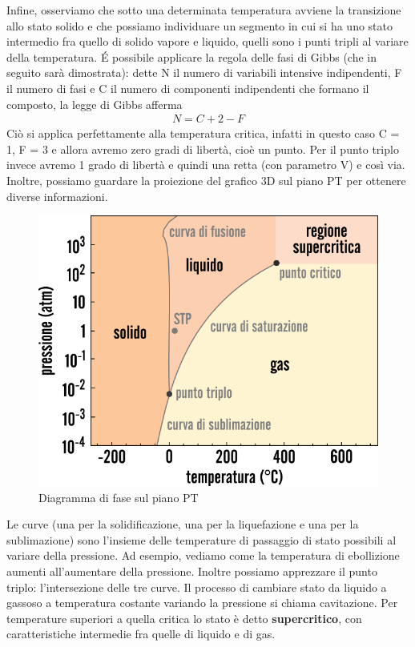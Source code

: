 \documentclass[
10pt, %
a4paper, %
oneside, %
headinclude,footinclude, %
BCOR5mm, %
]{scrartcl}
\begin{document}
Infine, osserviamo che sotto una determinata temperatura avviene la transizione allo stato solido e che possiamo individuare un segmento in cui si ha uno stato intermedio fra quello di solido vapore e liquido, quelli sono i punti tripli al variare della temperatura. \'{E} possibile applicare la regola delle fasi di Gibbs (che in seguito sarà dimostrata): dette N il numero di variabili intensive indipendenti, F il numero di fasi e C il numero di componenti indipendenti che formano il composto, la legge di Gibbs afferma
\begin{align*} 
	N = C + 2 - F
\end{align*}  
Ciò si applica perfettamente alla temperatura critica, infatti in questo caso C = 1, F = 3 e allora avremo zero gradi di libertà, cioè un punto. Per il punto triplo invece avremo 1 grado di libertà e quindi una retta (con parametro V) e così via.\\
Inoltre, possiamo guardare la proiezione del grafico 3D sul piano PT per ottenere diverse informazioni. 
\begin{figure}[h!]
	\centering
	\includegraphics[width=0.6\linewidth]{../images/diagrammadifasePT}
	\caption{Diagramma di fase sul piano PT}
	\label{fig:diagrammadifasept}
\end{figure}
\FloatBarrier
Le curve (una per la solidificazione, una per la liquefazione e una per la sublimazione) sono l'insieme delle temperature di passaggio di stato possibili al variare della pressione. Ad esempio, vediamo come la temperatura di ebollizione aumenti all'aumentare della pressione. Inoltre possiamo apprezzare il punto triplo: l'intersezione delle tre curve. Il processo di cambiare stato da liquido a gassoso a temperatura costante variando la pressione si chiama cavitazione. Per temperature superiori a quella critica lo stato è detto \textbf{supercritico}, con caratteristiche intermedie fra quelle di liquido e di gas. 
\newpage
\end{document}
